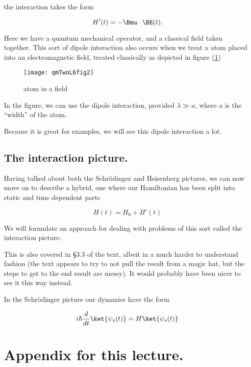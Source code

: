 the interaction takes the form

\begin{equation}\label{eqn:qmTwoL6:90}
H'(t) = -\Bmu \cdot \BE(t).
\end{equation}

Here we have a quantum mechanical operator, and a classical field taken together.  This sort of dipole interaction also occurs when we treat a atom placed into an electromagnetic field, treated classically as depicted in figure (\ref{fig:qmTwoL6fig2})

\begin{figure}[htp]
\centering
\texttt{[image: qmTwoL6fig2]}
\caption{atom in a field}\label{fig:qmTwoL6fig2}
\end{figure}

In the figure, we can use the dipole interaction, provided $\lambda \gg a$, where $a$ is the ``width'' of the atom.

Because it is great for examples, we will see this dipole interaction a lot.

\subsection{The interaction picture.}

Having talked about both the Schr\"{o}dinger and Heisenberg pictures, we can now move on to describe a hybrid, one where our Hamiltonian has been split into static and time dependent parts

\begin{equation}\label{eqn:qmTwoL6:110}
H(t) = H_0 + H'(t)
\end{equation}

We will formulate an approach for dealing with problems of this sort called the interaction picture.

This is also covered in \S 3.3 of the text, albeit in a much harder to understand fashion (the text appears to try to not pull the result from a magic hat, but the steps to get to the end result are messy).  It would probably have been nicer to see it this way instead.

In the Schr\"{o}dinger picture our dynamics have the form

\begin{equation}\label{eqn:qmTwoL6:130}
i \hbar \frac{d}{dt} \ket{\psi_s(t)} = H \ket{\psi_s(t)}
\end{equation}

\section{Appendix for this lecture.}

